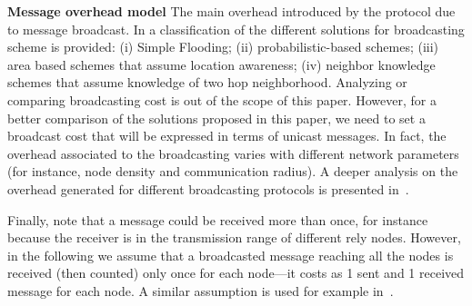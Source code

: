 \documentclass{IEEEconf}
\begin{document}
{\bf Message overhead model} The main overhead introduced by the protocol due to message broadcast.
In \cite{WC:ComparisonBroadcasting:MobiHoc02} a classification of the different solutions for broadcasting scheme is provided:
(i) Simple Flooding; (ii) probabilistic-based schemes;
(iii) area based schemes that assume location awareness;
(iv) neighbor knowledge schemes that assume knowledge of two hop neighborhood.
Analyzing or comparing broadcasting cost is out of the scope of this paper. However, for a better comparison of the solutions proposed in this paper, we need to set a broadcast cost that will be expressed in terms of unicast messages. In fact, the overhead associated to the broadcasting varies with different network parameters (for instance, node density and communication radius).
A deeper analysis on the overhead generated  for different broadcasting protocols is presented in~\cite{OPPV:LocaTechn:2004}.

Finally, note that a message could be received more than once, for instance because the receiver is in the transmission range of different rely nodes.
However, in the following we assume that a broadcasted message reaching all the nodes is received (then counted) only once for each node---it costs as 1 sent and 1 received message for each node.
A similar assumption is used for example in~\cite{OPPV:LocaTechn:2004}.
\end{document}
